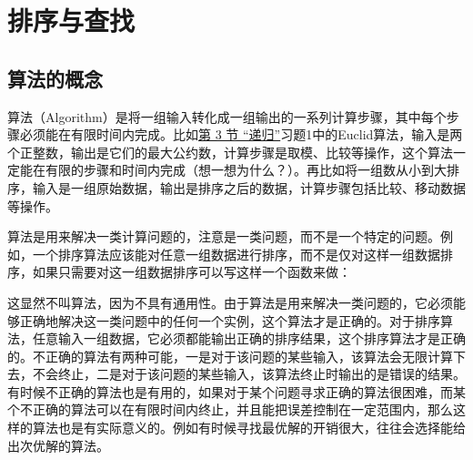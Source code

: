 

\chapter{排序与查找}
%





\section{算法的概念}
%
算法（Algorithm）是将一组输入转化成一组输出的一系列计算步骤，其中每个步骤必须能在有限时间内完成。比如\hyperlink{db.ch05s03.id2722951}{第 3 节 “递归”}习题1中的Euclid算法，输入是两个正整数，输出是它们的最大公约数，计算步骤是取模、比较等操作，这个算法一定能在有限的步骤和时间内完成（想一想为什么？）。再比如将一组数从小到大排序，输入是一组原始数据，输出是排序之后的数据，计算步骤包括比较、移动数据等操作。



算法是用来解决一类计算问题的，注意是一类问题，而不是一个特定的问题。例如，一个排序算法应该能对任意一组数据进行排序，而不是仅对这样一组数据排序，如果只需要对这一组数据排序可以写这样一个函数来做：




这显然不叫算法，因为不具有通用性。由于算法是用来解决一类问题的，它必须能够正确地解决这一类问题中的任何一个实例，这个算法才是正确的。对于排序算法，任意输入一组数据，它必须都能输出正确的排序结果，这个排序算法才是正确的。不正确的算法有两种可能，一是对于该问题的某些输入，该算法会无限计算下去，不会终止，二是对于该问题的某些输入，该算法终止时输出的是错误的结果。有时候不正确的算法也是有用的，如果对于某个问题寻求正确的算法很困难，而某个不正确的算法可以在有限时间内终止，并且能把误差控制在一定范围内，那么这样的算法也是有实际意义的。例如有时候寻找最优解的开销很大，往往会选择能给出次优解的算法。



